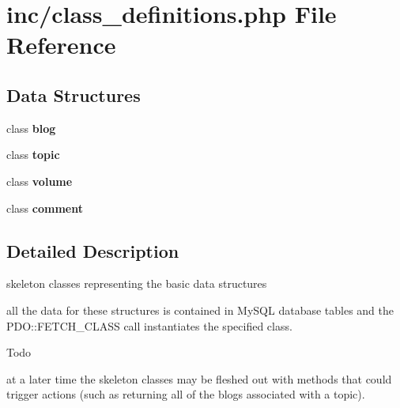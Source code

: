 \section{inc/class\+\_\+definitions.php File Reference}
\label{class__definitions_8php}
\subsection*{Data Structures}
\begin{DoxyCompactItemize}
\item 
class {\bf blog}
\item 
class {\bf topic}
\item 
class {\bf volume}
\item 
class {\bf comment}
\end{DoxyCompactItemize}


\subsection{Detailed Description}
skeleton classes representing the basic data structures

all the data for these structures is contained in My\+S\+QL database tables and the P\+D\+O\+::\+F\+E\+T\+C\+H\+\_\+\+C\+L\+A\+SS call instantiates the specified class.

\begin{DoxyRefDesc}{Todo}
\item[{\bf Todo}]at a later time the skeleton classes may be fleshed out with methods that could trigger actions (such as returning all of the blogs associated with a topic).\end{DoxyRefDesc}
